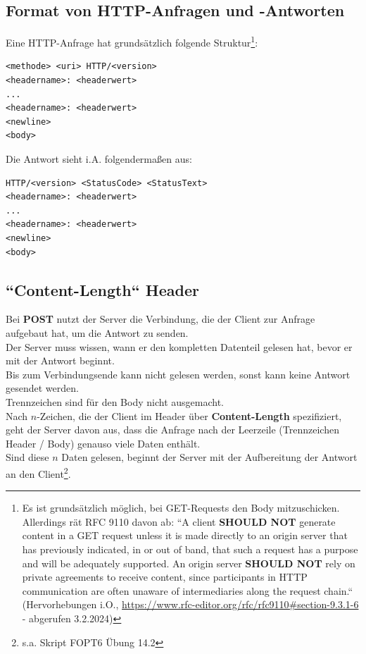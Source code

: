 \subsection{Format von HTTP-Anfragen und -Antworten}

Eine HTTP-Anfrage hat grundsätzlich folgende Struktur\footnote{
Es ist grundsätzlich möglich, bei GET-Requests den Body mitzuschicken.
    Allerdings rät RFC 9110 davon ab: ``A client \textbf{SHOULD NOT} generate content in a GET request unless it is made directly to an origin server that has previously indicated, in or out of band, that such a request has a purpose and will be adequately supported. An origin server \textbf{SHOULD NOT} rely on private agreements to receive content, since participants in HTTP communication are often unaware of intermediaries along the request chain.`` (Hervorhebungen i.O., \url{https://www.rfc-editor.org/rfc/rfc9110#section-9.3.1-6} - abgerufen 3.2.2024)
}:

\begin{verbatim}
<methode> <uri> HTTP/<version>
<headername>: <headerwert>
...
<headername>: <headerwert>
<newline>
<body>
\end{verbatim}

Die Antwort sieht i.A. folgendermaßen aus:

\begin{verbatim}
HTTP/<version> <StatusCode> <StatusText>
<headername>: <headerwert>
...
<headername>: <headerwert>
<newline>
<body>
\end{verbatim}

\subsection*{``Content-Length`` Header}
Bei \textbf{POST} nutzt der Server die Verbindung, die der Client zur Anfrage aufgebaut hat, um die Antwort zu senden.\\
Der Server muss wissen, wann er den kompletten Datenteil gelesen hat, bevor er mit der Antwort beginnt.\\
Bis zum Verbindungsende kann nicht gelesen werden, sonst kann keine Antwort gesendet werden.\\
Trennzeichen sind für den Body nicht ausgemacht.\\
Nach $n$-Zeichen, die der Client im Header über \textbf{Content-Length} spezifiziert, geht der Server davon aus, dass die Anfrage nach der Leerzeile (Trennzeichen Header / Body) genauso viele Daten enthält.\\
Sind diese $n$ Daten gelesen, beginnt der Server mit der Aufbereitung der Antwort an den Client\footnote{
s.a. Skript FOPT6 Übung 14.2
}.

